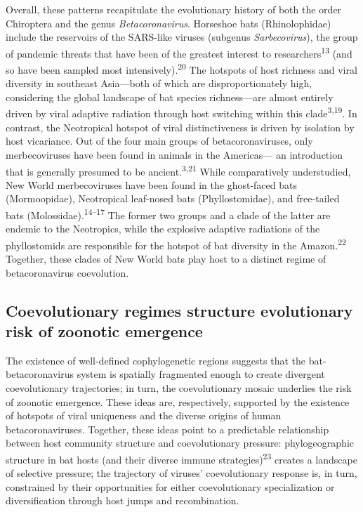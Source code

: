 \documentclass[11pt]{article}
\begin{document}
Overall, these patterns recapitulate the evolutionary history of both
the order Chiroptera and the genus \emph{Betacoronavirus}. Horseshoe
bats (Rhinolophidae) include the reservoirs of the SARS-like viruses
(subgenus \emph{Sarbecovirus}), the group of pandemic threats that have
been of the greatest interest to researchers\textsuperscript{13} (and so
have been sampled most intensively).\textsuperscript{20} The hotspots of
host richness and viral diversity in southeast Asia---both of which are
disproportionately high, considering the global landscape of bat species
richness---are almost entirely driven by viral adaptive radiation
through host switching within this clade\textsuperscript{3,19}. In
contrast, the Neotropical hotspot of viral distinctiveness is driven by
isolation by host vicariance. Out of the four main groups of
betacoronaviruses, only merbecoviruses have been found in animals in the
Americas--- an introduction that is generally presumed to be
ancient.\textsuperscript{3,21} While comparatively understudied, New
World merbecoviruses have been found in the ghost-faced bats
(Mormoopidae), Neotropical leaf-nosed bats (Phyllostomidae), and
free-tailed bats (Molossidae).\textsuperscript{14--17} The former two
groups and a clade of the latter are endemic to the Neotropics, while
the explosive adaptive radiations of the phyllostomids are responsible
for the hotspot of bat diversity in the Amazon.\textsuperscript{22}
Together, these clades of New World bats play host to a distinct regime
of betacoronavirus coevolution.

\hypertarget{coevolutionary-regimes-structure-evolutionary-risk-of-zoonotic-emergence}{%
\subsection{Coevolutionary regimes structure evolutionary risk of
zoonotic
emergence}\label{coevolutionary-regimes-structure-evolutionary-risk-of-zoonotic-emergence}}

The existence of well-defined cophylogenetic regions suggests that the
bat-betacoronavirus system is spatially fragmented enough to create
divergent coevolutionary trajectories; in turn, the coevolutionary
mosaic underlies the risk of zoonotic emergence. These ideas are,
respectively, supported by the existence of hotspots of viral uniqueness
and the diverse origins of human betacoronaviruses. Together, these
ideas point to a predictable relationship between host community
structure and coevolutionary pressure: phylogeographic structure in bat
hosts (and their diverse immune strategies)\textsuperscript{23} creates
a landscape of selective pressure; the trajectory of viruses'
coevolutionary response is, in turn, constrained by their opportunities
for either coevolutionary specialization or diversification through host
jumps and recombination.
\end{document}
